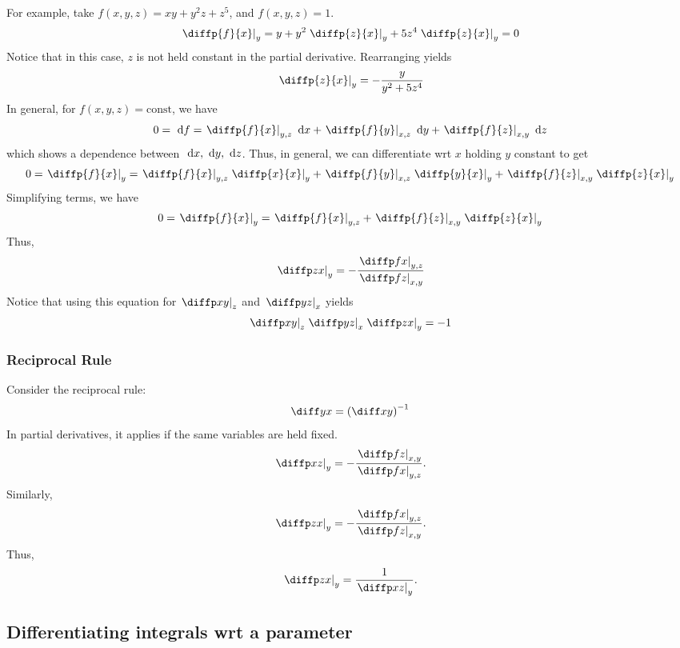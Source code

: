 \documentclass[12pt]{article}
\begin{document}
For example, take $f(x,y,z) = xy + y^{2}z+ z^{5}$, and $f(x,y,z) = 1$.
\[
    \left.\diffp{f}{x}\right|_{y} = y + y^{2}\left.\diffp{z}{x}\right|_{y} + 5z^{4}\left.\diffp{z}{x}\right|_{y} = 0
\]
Notice that in this case, $z$ is not held constant in the partial derivative.
Rearranging yields
\[
\left.\diffp{z}{x}\right|_{y} = -\frac{y}{y^{2} + 5z^{4}}
\]
In general, for $f(x,y,z) = \text{const}$, we have
\[
    0 = \di f = \left.\diffp{f}{x}\right|_{y,z}\di x + \left.\diffp{f}{y}\right|_{x,z}\di y + \left.\diffp{f}{z}\right|_{x,y}\di z
\]
which shows a dependence between $\ \mathrm{d} x, \ \mathrm{d} y, \ \mathrm{d} z$.
Thus, in general, we can differentiate wrt $x$ holding $y$ constant to get
\[
0 = \left.\diffp{f}{x}\right|_{y} = \left.\diffp{f}{x}\right|_{y,z}\left.\diffp{x}{x}\right|_{y}
            + \left.\diffp{f}{y}\right|_{x,z}\left.\diffp{y}{x}\right|_{y}
                    +\left.\diffp{f}{z}\right|_{x,y}\left.\diffp{z}{x}\right|_{y}
\]
Simplifying terms, we have
\[
0 = \left.\diffp{f}{x}\right|_{y} = \left.\diffp{f}{x}\right|_{y,z}
                    +\left.\diffp{f}{z}\right|_{x,y}\left.\diffp{z}{x}\right|_{y}
\]
Thus,
\[
    \diffpc{z}{x}{y} = -\frac{\diffpc{f}{x}{y,z}}{\diffpc{f}{z}{x,y}}
\]
Notice that using this equation for $\diffpc{x}{y}{z}$ and $\diffpc{y}{z}{x}$
yields
\[
\diffpc{x}{y}{z}\diffpc{y}{z}{x}\diffpc{z}{x}{y} = -1
\]

\subsubsection*{Reciprocal Rule}

Consider the reciprocal rule:
\[
\diff yx = \left(\diff xy\right)^{-1}
\]
In partial derivatives, it applies if the same variables are held fixed.
\[
\diffpc{x}{z}{y} = -\frac{\diffpc{f}{z}{x,y}}{\diffpc{f}{x}{y,z}}.
\]
Similarly,
\[
\diffpc{z}{x}{y} = -\frac{\diffpc{f}{x}{y,z}}{\diffpc{f}{z}{x,y}}.
\]
Thus,
\[
\diffpc{z}{x}{y} = \frac{1}{\diffpc{x}{z}{y}}.
\]

\subsection{Differentiating integrals wrt a parameter}
\end{document}
